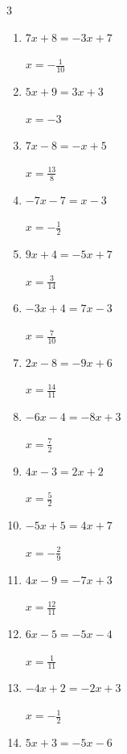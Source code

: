\begin{multicols}{3}
\begin{enumerate}
        $\displaystyle x=\frac{13}{8}$

\columnbreak %

\resetques

  \item $7x+8=-3x+7$

        $\displaystyle x=-\frac{1}{10}$

  \item $5x+9=3x+3$

        $\displaystyle x=-3$

  \item $7x-8=-x+5$

        $\displaystyle x=\frac{13}{8}$

  \item $-7x-7=x-3$

        $\displaystyle x=-\frac{1}{2}$

  \item $9x+4=-5x+7$

        $\displaystyle x=\frac{3}{14}$

  \item $-3x+4=7x-3$

        $\displaystyle x=\frac{7}{10}$

  \item $2x-8=-9x+6$

        $\displaystyle x=\frac{14}{11}$

  \item $-6x-4=-8x+3$

        $\displaystyle x=\frac{7}{2}$

  \item $4x-3=2x+2$

        $\displaystyle x=\frac{5}{2}$

  \item $-5x+5=4x+7$

        $\displaystyle x=-\frac{2}{9}$

  \item $4x-9=-7x+3$

        $\displaystyle x=\frac{12}{11}$

  \item $6x-5=-5x-4$

        $\displaystyle x=\frac{1}{11}$

  \item $-4x+2=-2x+3$

        $\displaystyle x=-\frac{1}{2}$

  \item $5x+3=-5x-6$


\end{enumerate}
\end{multicols}
